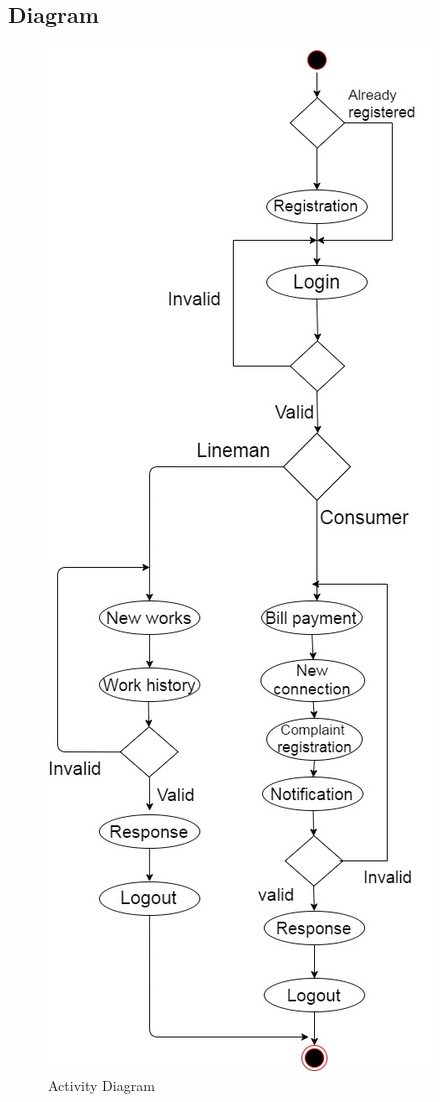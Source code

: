 \documentclass[12pt,a4paper,oneside]{report}
\begin{document}
\subsection{Diagram}
\begin{figure}[H]
  	\begin{center}
  		\includegraphics[scale=0.5]{actyeba.png}
  			\caption{Activity Diagram}
  			\label{Activity Diagram}
  	\end{center}
  \end{figure}
 \newpage
\end{document}
